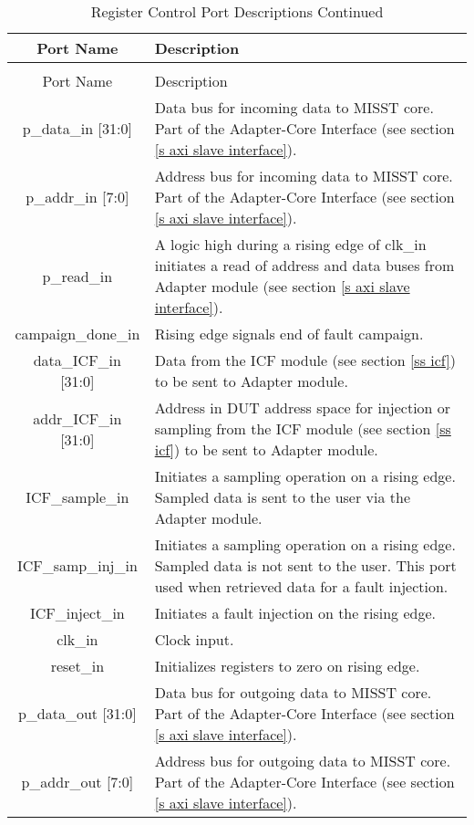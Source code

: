 \documentclass[]{report}
\begin{document}
\begin{center}
	\begin{longtable}{|c|p{11cm}|}
		\caption{Register Control Port Descriptions}
		\label{table:reg control port desc}\\
		\hline 
		Port Name & Description \\ 
		\hline 
		\endfirsthead
		\caption{Register Control Port Descriptions Continued}\\
		\hline
		Port Name & Description\\
		\endhead
		\hline
		p\_data\_in [31:0] & Data bus for incoming data to MISST core. Part of the Adapter-Core Interface (see section \ref{s axi slave interface}). \\ 
		\hline 
		p\_addr\_in [7:0] &  Address bus for incoming data to MISST core. Part of the Adapter-Core Interface (see section \ref{s axi slave interface}).\\ 
		\hline 
		p\_read\_in & A logic high during a rising edge of clk\_in initiates a read of address and data buses from Adapter module (see section \ref{s axi slave interface}).\\ 
		\hline 
		campaign\_done\_in & Rising edge signals end of fault campaign. \\ 
		\hline 
		data\_ICF\_in [31:0] & Data from the ICF module (see section \ref{ss icf}) to be sent to Adapter module. \\ 
		\hline 
		addr\_ICF\_in [31:0] & Address in DUT address space for injection or sampling from the ICF module (see section \ref{ss icf}) to be sent to Adapter module. \\ 
		\hline 
		ICF\_sample\_in & Initiates a sampling operation on a rising edge. Sampled data is sent to the user via the Adapter module.\\
		\hline
		ICF\_samp\_inj\_in & Initiates a sampling operation on a rising edge. Sampled data is not sent to the user. This port used when retrieved data for a fault injection.\\
		\hline
		ICF\_inject\_in & Initiates a fault injection on the rising edge.\\
		\hline
		clk\_in & Clock input.\\
		\hline
		reset\_in & Initializes registers to zero on rising edge.\\
		\hline
		p\_data\_out [31:0] & Data bus for outgoing data to MISST core. Part of the Adapter-Core Interface (see section \ref{s axi slave interface}).\\
		\hline
		p\_addr\_out [7:0] & Address bus for outgoing data to MISST core. Part of the Adapter-Core Interface (see section \ref{s axi slave interface}).\\

\end{longtable}
\end{center}
\end{document}

